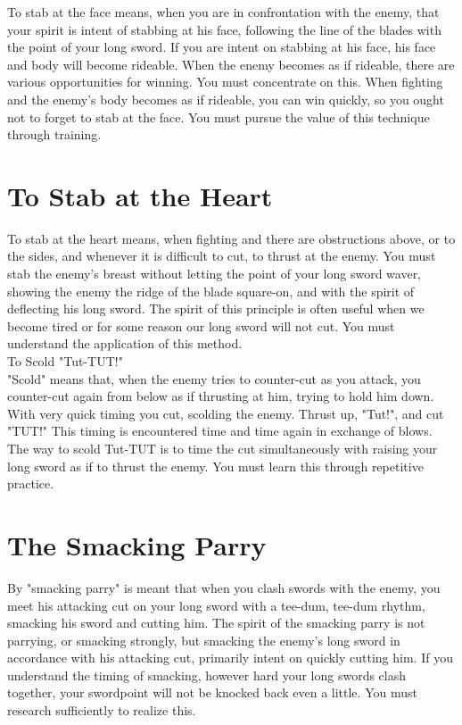 To stab at the face means, when you are in confrontation with the enemy, that your spirit is intent of stabbing at his face, following the line of the blades with the point of your long sword. If you are intent on stabbing at his face, his face and body will become rideable. When the enemy becomes as if rideable, there are various opportunities for winning. You must concentrate on this. When fighting and the enemy's body becomes as if rideable, you can win quickly, so you ought not to forget to stab at the face. You must pursue the value of this technique through training.\\
\section{To Stab at the Heart}

To stab at the heart means, when fighting and there are obstructions above, or to the sides, and whenever it is difficult to cut, to thrust at the enemy. You must stab the enemy's breast without letting the point of your long sword waver, showing the enemy the ridge of the blade square-on, and with the spirit of deflecting his long sword. The spirit of this principle is often useful when we become tired or for some reason our long sword will not cut. You must understand the application of this method.\\
To Scold "Tut-TUT!"\\

"Scold" means that, when the enemy tries to counter-cut as you attack, you counter-cut again from below as if thrusting at him, trying to hold him down. With very quick timing you cut, scolding the enemy. Thrust up, "Tut!", and cut "TUT!" This timing is encountered time and time again in exchange of blows. The way to scold Tut-TUT is to time the cut simultaneously with raising your long sword as if to thrust the enemy. You must learn this through repetitive practice.\\
\section{The Smacking Parry}

By "smacking parry" is meant that when you clash swords with the enemy, you meet his attacking cut on your long sword with a tee-dum, tee-dum rhythm, smacking his sword and cutting him. The spirit of the smacking parry is not parrying, or smacking strongly, but smacking the enemy's long sword in accordance with his attacking cut, primarily intent on quickly cutting him. If you understand the timing of smacking, however hard your long swords clash together, your swordpoint will not be knocked back even a little. You must research sufficiently to realize this.\\
